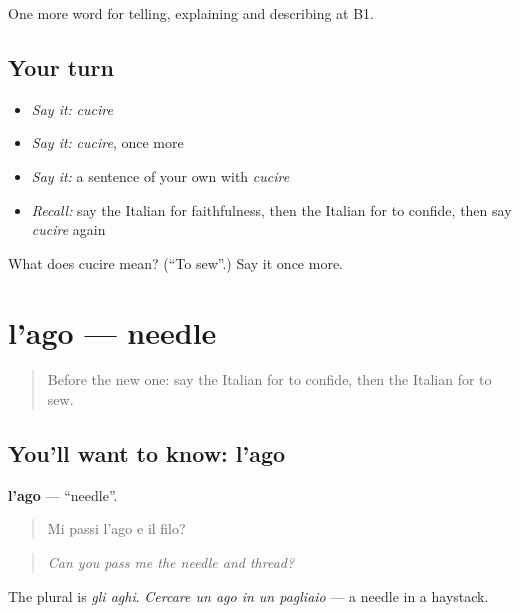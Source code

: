 \begin{grammarlens}[title={What you've built}]
One more word for telling, explaining and describing at B1.
\end{grammarlens}

\subsection*{Your turn}
\begin{itemize}
\raggedright
  \item \emph{Say it:} \emph{cucire}
  \item \emph{Say it:} \emph{cucire}, once more
  \item \emph{Say it:} a sentence of your own with \emph{cucire}
  \item \emph{Recall:} say the Italian for faithfulness, then the Italian for to confide, then say \emph{cucire} again
\end{itemize}

\begin{tcolorbox}[breakable,colback=teal!4,colframe=teal!35!black,title={Before you move on}]
What does cucire mean? (\textquotedblleft{}To sew\textquotedblright{}.) Say it once more.
\end{tcolorbox}
\section[l'ago]{l'ago — needle}

\label{lesson:IT-C500-ago}



\begin{quote}
Before the new one: say the Italian for to confide, then the Italian for to sew.
\end{quote}

\subsection*{You'll want to know: l'ago}
\textbf{l'ago} — \textquotedblleft{}needle\textquotedblright{}.

\begin{quote}
Mi passi l'ago e il filo?
\end{quote}

\begin{quote}
\emph{Can you pass me the needle and thread?}
\end{quote}

The plural is \emph{gli aghi}. \emph{Cercare un ago in un pagliaio} — a needle in a haystack.

